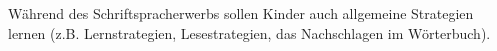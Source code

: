 Während des Schriftspracherwerbs sollen Kinder auch allgemeine Strategien lernen (z.B. Lernstrategien, Lesestrategien, das Nachschlagen im Wörterbuch).